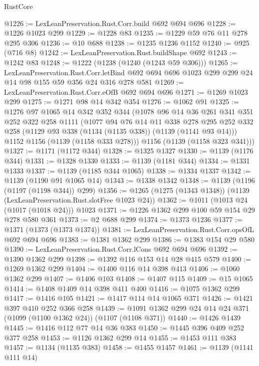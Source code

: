 \begin{lexlean}{RustCore}
\begin{coremodule}
@1226 := LexLeanPreservation.Rust.Corr.build @692 @694 @696
@1228 := @1226 @1023 @299
@1229 := @1228 @83
@1235 := @1229 @59 @76 @11 @278 @295 @306
@1236 := @10 @688
@1238 := @1235 @1236 @1152
@1240 := @925 (@716 @8)
@1242 := LexLeanPreservation.Rust.buildShape @692
@1243 := @1242 @83
@1248 := @1222 (@1238 (@1240 (@1243 @59 @306)))
@1265 := LexLeanPreservation.Rust.Corr.letBind
    @692
    @694
    @696
    @1023
    @299
    @299
    @24
    @14
    @98
    @155
    @59
    @356
    @24
    @316
    @278
    @581
@1269 := LexLeanPreservation.Rust.Corr.eOfB @692 @694 @696
@1271 := @1269 @1023 @299
@1275 := @1271 @98 @14 @342 @354
@1276 := @1062 @91
@1325 := @1276
    @97
    @1065
    @14
    @342
    @352
    @344
    (@1078
      @96
      @14
      @36
      @261
      @341
      @351
      @252
      @322
      @258
      @1111
      (@1077
        @94
        @76
        @14
        @11
        @338
        @278
        @295
        @252
        @332
        @258
        (@1129 @93 @338 (@1134 (@1135 @338)) (@1139 (@1141 @93 @14)))
        @1152
        @1156
        (@1139 (@1158 @333 @278)))
      @1156
      (@1139 (@1158 @323 @341)))
@1327 := @1171 (@1172 @344)
@1328 := @1325 @1327
@1330 := @1139 (@1176 @344)
@1331 := @1328 @1330
@1333 := @1139 (@1181 @344)
@1334 := @1331 @1333
@1337 := @1139 (@1185 @344 @1065)
@1338 := @1334 @1337
@1342 := @1139 (@1190 @91 @1065 @14)
@1343 := @1338 @1342
@1348 := @1139 (@1196 (@1197 (@1198 @344)) @299)
@1356 := @1265 (@1275 (@1343 @1348)) (@1139 (LexLeanPreservation.Rust.slotFree @1023 @24))
@1362 := @1011 (@1013 @24 (@1017 (@1018 @24))) @1023
@1371 := @1226 @1362 @299 @100 @59 @154 @29 @278 @580 @361
@1373 := @2 @688 @299
@1374 := @1373 @1236
@1377 := @1371 (@1373 (@1373 @1374))
@1381 := LexLeanPreservation.Rust.Corr.opsOfL @692 @694 @696
@1383 := @1381 @1362 @299
@1386 := @1383 @154 @29 @580
@1390 := LexLeanPreservation.Rust.Corr.lCons @692 @694 @696
@1392 := @1390 @1362 @299
@1398 := @1392 @116 @153 @14 @28 @415 @579
@1400 := @1269 @1362 @299
@1404 := @1400 @116 @14 @398 @413
@1406 := @1060 @1362 @299
@1407 := @1406 @103
@1408 := @1407 @115
@1409 := @15 @1065
@1414 := @1408 @1409 @14 @398 @411 @400
@1416 := @1075 @1362 @299
@1417 := @1416 @105
@1421 := @1417 @114 @14 @1065 @371
@1426 := @1421 @397 @410 @252 @366 @258
@1439 := @1091 @1362 @299 @24 @14 @24 @371 (@1099 (@1100 @1362 @24)) (@1107 (@1108 @371))
@1440 := @1426 @1439
@1445 := @1416 @112 @77 @14 @36 @383
@1450 := @1445 @396 @409 @252 @377 @258
@1453 := @1126 @1362 @299 @14
@1455 := @1453 @111 @383
@1457 := @1134 (@1135 @383)
@1458 := @1455 @1457
@1461 := @1139 (@1141 @111 @14)

\end{coremodule}
\end{lexlean}

